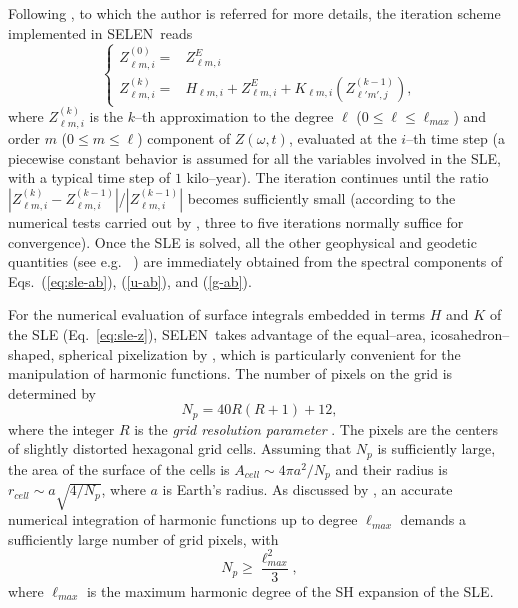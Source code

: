 \documentclass[11pt,fleqn,a4paper,titlepage]{article}
\newcommand\selen{\textsf{SELEN~}}
\begin{document}
{Following \citet{Spada_and_Stocchi_2007}, to which the author is referred for 
more details, the iteration scheme implemented in \selen reads 
\begin{equation}\label{eq:iteration-scheme}
\left\{ \begin{array}{ll} 
Z^{(0)}_{\ell m,i} = & Z^E_{\ell m,i} \\
Z^{(k)}_{\ell m,i} = & H_{\ell m,i}  + Z^E_{\ell m,i} + K_{\ell m,i}\left(Z^{(k-1)}_{\ell'm',j}\right),  
\end{array} \right. 
\end{equation} 
where $Z^{(k)}_{\ell m,i}$ is the $k$--th approximation to the degree $\ell$ ($0 \le \ell \le \ell_{max}$) and order $m$ ($0 \le m \le \ell$) component 
of $Z(\omega,t)$, evaluated at the $i$--th time step (a piecewise constant behavior is assumed for all the 
variables involved in the SLE, with a typical time step of $1$ kilo--year). The iteration continues until the ratio 
$|Z^{(k)}_{\ell m,i}-Z^{(k-1)}_{\ell m,i}|$/$|Z^{(k-1)}_{\ell m,i}|$  becomes sufficiently small (according to the numerical tests carried out by \cite{Spada_and_Stocchi_2007}, three to five iterations normally suffice for convergence). Once the SLE is solved, all the other geophysical and geodetic quantities (see e.g. \citeauthor{Spada_etal_2012a}~\citeyear{Spada_etal_2012a}) 
are immediately obtained from the spectral components of Eqs.~(\ref{eq:sle-ab}), (\ref{u-ab}), and (\ref{g-ab}). 

For the numerical evaluation of surface integrals embedded in terms $H$ and $K$ of the SLE 
(Eq.~\ref{eq:sle-z}), \selen takes advantage of the equal--area, icosahedron--shaped, spherical 
pixelization by \citet{Tegmark_1996}, which is particularly convenient for the manipulation 
of harmonic functions.  
The number of pixels on the grid is determined by 
\begin{equation}\label{eq:np}
N_p = 40R(R+1) + 12, 
\end{equation} 
where the integer $R$ is the \textit{grid resolution parameter} \citep{Tegmark_1996}. The pixels 
are the centers of slightly distorted hexagonal grid cells. Assuming that $N_p$ is sufficiently large, 
the area of the surface of the cells is $A_{cell}\sim 4\pi a^2/N_p$
and their radius is $r_{cell} \sim a\sqrt{4/N_p}$, where $a$ is Earth's radius. 
As discussed by \citet{Tegmark_1996}, an accurate numerical integration of harmonic functions up 
to degree $\ell_{max}$ demands a sufficiently large number of grid pixels, with  
\begin{equation}\label{eq:constraint-lmax-r}
N_p \ge \frac{\ell^2_{max}}{3}, 
\end{equation}
where $\ell_{max}$ is the maximum harmonic degree of the SH expansion of the SLE. 

}
\end{document}
